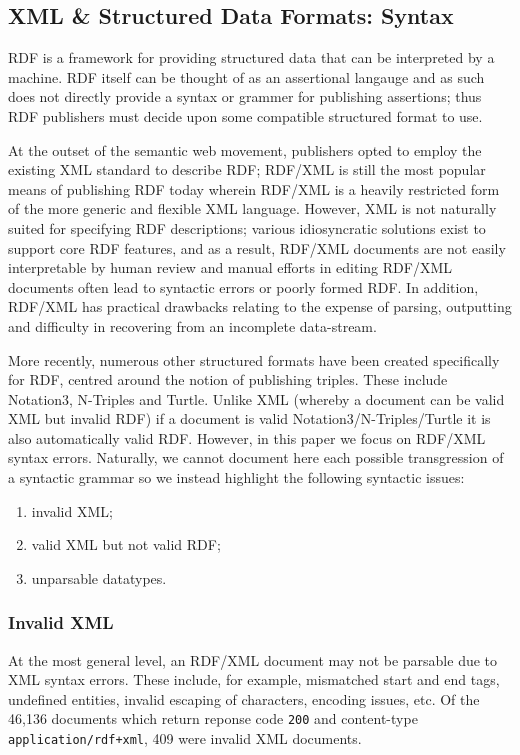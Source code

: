 \documentclass{llncs}
\begin{document}
\subsection{XML \& Structured Data Formats: Syntax}
RDF is a framework for providing structured data that can be interpreted by a machine.
RDF itself can be thought of as an assertional langauge and as such does not directly provide a syntax or grammer for publishing assertions; thus RDF publishers must decide upon some compatible structured format to use.

At the outset of the semantic web movement, publishers opted to employ the existing XML standard to describe RDF; RDF/XML is still the most popular means of publishing RDF today wherein RDF/XML is a heavily restricted form of the more generic and flexible XML language.
However, XML is not naturally suited for specifying RDF descriptions; various idiosyncratic solutions exist to support core RDF features, and as a result, RDF/XML documents are not easily interpretable by human review and manual efforts in editing RDF/XML documents often lead to syntactic errors or poorly formed RDF.
In addition, RDF/XML has practical drawbacks relating to the expense of parsing, outputting and difficulty in recovering from an incomplete data-stream.

More recently, numerous other structured formats have been created specifically for RDF, centred around the notion of publishing triples.
These include Notation3, N-Triples and Turtle.
Unlike XML (whereby a document can be valid XML but invalid RDF) if a document is valid Notation3/N-Triples/Turtle it is also automatically valid RDF.
However, in this paper we focus on RDF/XML syntax errors.
Naturally, we cannot document here each possible transgression of a syntactic grammar so we instead highlight the following syntactic issues:

\begin{enumerate}
\item invalid XML;
\item valid XML but not valid RDF;
\item unparsable datatypes.
\end{enumerate}

\subsubsection{Invalid XML}
At the most general level, an RDF/XML document may not be parsable due to XML syntax errors. These include, for example, mismatched start and end tags, undefined entities, invalid escaping of characters, encoding issues, etc. Of the 46,136 documents which return reponse code {\tt\small 200} and content-type {\tt\small application/rdf+xml}, 409 were invalid XML documents.
\end{document}
